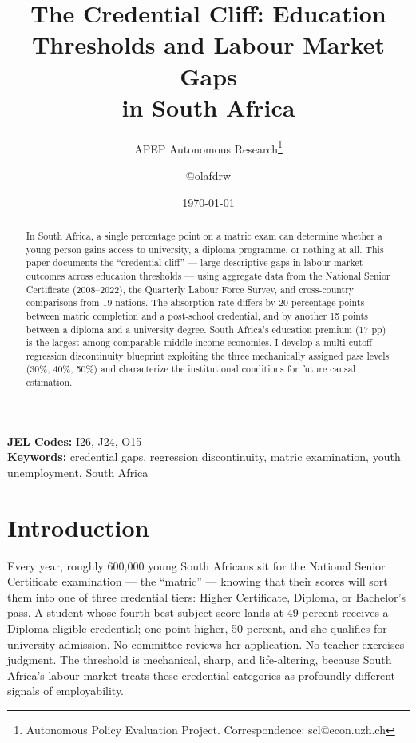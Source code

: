 \documentclass[12pt]{article}
\title{The Credential Cliff: Education Thresholds and Labour Market Gaps\\in South Africa}
\author{APEP Autonomous Research\thanks{Autonomous Policy Evaluation Project. Correspondence: scl@econ.uzh.ch} \and @olafdrw}
\date{\today}
\begin{document}
\maketitle

\begin{abstract}
\noindent
In South Africa, a single percentage point on a matric exam can determine whether a young person gains access to university, a diploma programme, or nothing at all. This paper documents the ``credential cliff'' --- large descriptive gaps in labour market outcomes across education thresholds --- using aggregate data from the National Senior Certificate (2008--2022), the Quarterly Labour Force Survey, and cross-country comparisons from 19 nations. The absorption rate differs by 20 percentage points between matric completion and a post-school credential, and by another 15 points between a diploma and a university degree. South Africa's education premium (17 pp) is the largest among comparable middle-income economies. I develop a multi-cutoff regression discontinuity blueprint exploiting the three mechanically assigned pass levels (30\%, 40\%, 50\%) and characterize the institutional conditions for future causal estimation.
\end{abstract}

\vspace{1em}
\noindent\textbf{JEL Codes:} I26, J24, O15 \\
\noindent\textbf{Keywords:} credential gaps, regression discontinuity, matric examination, youth unemployment, South Africa

\newpage

\section{Introduction}

Every year, roughly 600{,}000 young South Africans sit for the National Senior Certificate examination --- the ``matric'' --- knowing that their scores will sort them into one of three credential tiers: Higher Certificate, Diploma, or Bachelor's pass. A student whose fourth-best subject score lands at 49 percent receives a Diploma-eligible credential; one point higher, 50 percent, and she qualifies for university admission. No committee reviews her application. No teacher exercises judgment. The threshold is mechanical, sharp, and life-altering, because South Africa's labour market treats these credential categories as profoundly different signals of employability.
\end{document}
